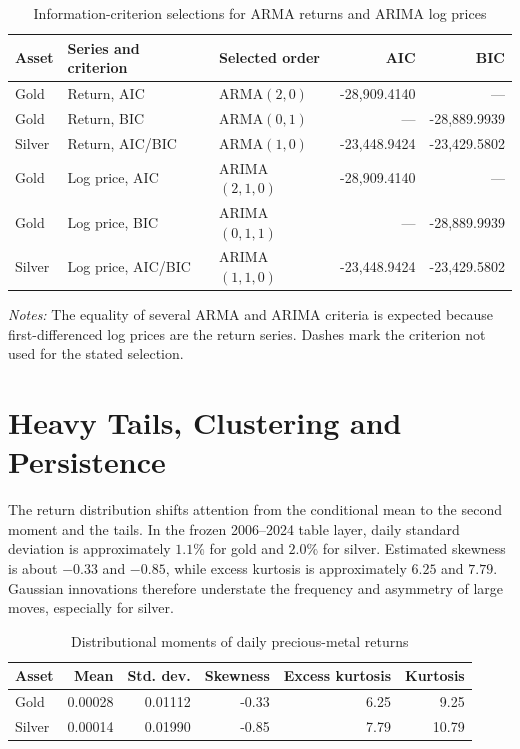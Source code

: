 \begin{table}[htbp]
\centering
\caption{Information-criterion selections for ARMA returns and ARIMA log prices}
\label{tab:t7-arma-arima-selection}
\small
\begin{tabular}{lllrr}
\toprule
Asset & Series and criterion & Selected order & AIC & BIC \\
\midrule
Gold   & Return, AIC      & ARMA$(2,0)$  & -28,909.4140 & --- \\
Gold   & Return, BIC      & ARMA$(0,1)$  & --- & -28,889.9939 \\
Silver & Return, AIC/BIC  & ARMA$(1,0)$  & -23,448.9424 & -23,429.5802 \\
Gold   & Log price, AIC   & ARIMA$(2,1,0)$ & -28,909.4140 & --- \\
Gold   & Log price, BIC   & ARIMA$(0,1,1)$ & --- & -28,889.9939 \\
Silver & Log price, AIC/BIC & ARIMA$(1,1,0)$ & -23,448.9424 & -23,429.5802 \\
\bottomrule
\end{tabular}
\begin{minipage}{0.94\textwidth}
\footnotesize\emph{Notes:} The equality of several ARMA and ARIMA criteria is
expected because first-differenced log prices are the return series. Dashes
mark the criterion not used for the stated selection.
\end{minipage}
\end{table}

\section{Heavy Tails, Clustering and Persistence}

The return distribution shifts attention from the conditional mean to the
second moment and the tails. In the frozen 2006--2024 table layer, daily standard deviation
is approximately $1.1\%$ for gold and $2.0\%$ for silver. Estimated skewness is
about $-0.33$ and $-0.85$, while excess kurtosis is approximately $6.25$ and
$7.79$. Gaussian innovations therefore understate the frequency and asymmetry
of large moves, especially for silver.

\begin{table}[htbp]
\centering
\caption{Distributional moments of daily precious-metal returns}
\label{tab:t7-return-moments}
\small
\begin{tabular}{lrrrrr}
\toprule
Asset & Mean & Std. dev. & Skewness & Excess kurtosis & Kurtosis \\
\midrule
Gold   & 0.00028 & 0.01112 & -0.33 & 6.25 & 9.25 \\
Silver & 0.00014 & 0.01990 & -0.85 & 7.79 & 10.79 \\
\bottomrule
\end{tabular}
\end{table}

